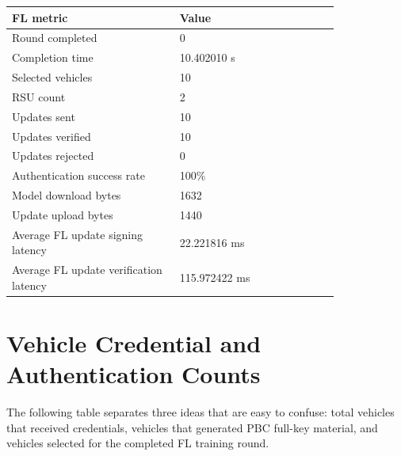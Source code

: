 \documentclass[11pt,a4paper]{article}
\begin{document}
\begin{longtable}{p{0.42\linewidth}p{0.40\linewidth}}
\toprule
\textbf{FL metric} & \textbf{Value} \\
\midrule
Round completed & 0 \\
Completion time & 10.402010 s \\
Selected vehicles & 10 \\
RSU count & 2 \\
Updates sent & 10 \\
Updates verified & 10 \\
Updates rejected & 0 \\
Authentication success rate & 100\% \\
Model download bytes & 1632 \\
Update upload bytes & 1440 \\
Average FL update signing latency & 22.221816 ms \\
Average FL update verification latency & 115.972422 ms \\
\bottomrule
\end{longtable}

\section{Vehicle Credential and Authentication Counts}

The following table separates three ideas that are easy to confuse: total
vehicles that received credentials, vehicles that generated PBC full-key
material, and vehicles selected for the completed FL training round.
\end{document}
